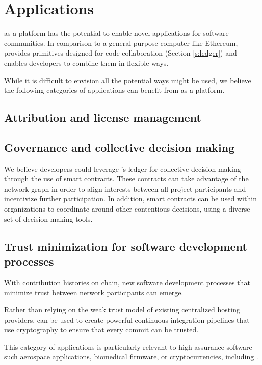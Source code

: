 \section{Applications}

\Oscoin{} as a platform has the potential to enable novel applications for
software communities. In comparison to a general purpose computer like
Ethereum, \oscoin{} provides primitives designed for code collaboration
(Section \ref{s:ledger}) and enables developers to combine them in flexible ways.

While it is difficult to envision all the potential ways \oscoin{} might be used, we
believe the following categories of applications can benefit from \oscoin{}
as a platform.

\subsection{Attribution and license management}

\subsection{Governance and collective decision making}

We believe developers could leverage \oscoin{}’s ledger for collective decision
making through the use of smart contracts. These contracts can take advantage of the
network graph in order to align interests between all project participants and
incentivize further participation. In addition, smart contracts can be used
within organizations to coordinate around other contentious decisions, using a
diverse set of decision making tools.

\subsection{Trust minimization for software development processes}
With contribution histories on chain, new software development processes that
minimize trust between network participants can emerge.

Rather than relying on the weak trust model of existing centralized hosting
providers, \oscoin{} can be used to create powerful continuous integration
pipelines that use cryptography to ensure that every commit can be trusted.

This category of applications is particularly relevant to high-assurance
software such aerospace applications, biomedical firmware, or cryptocurrencies,
including \oscoin{}.

